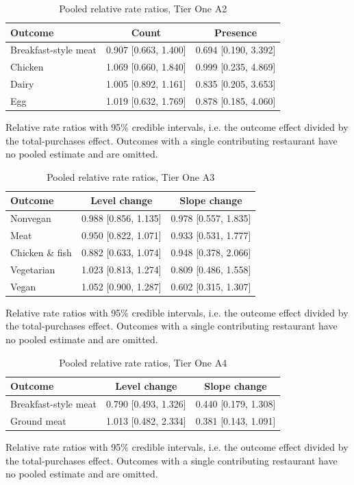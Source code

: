 \begin{table}[H]
\centering
\caption{Pooled relative rate ratios, Tier One A2}
\label{tab:rr_t1_a2}
\begin{tabular}{lcc}
\toprule
Outcome & Count & Presence \\
\midrule
Breakfast-style meat & 0.907 [0.663, 1.400] & 0.694 [0.190, 3.392] \\
Chicken & 1.069 [0.660, 1.840] & 0.999 [0.235, 4.869] \\
Dairy & 1.005 [0.892, 1.161] & 0.835 [0.205, 3.653] \\
Egg & 1.019 [0.632, 1.769] & 0.878 [0.185, 4.060] \\
\bottomrule
\end{tabular}
\par\smallskip\footnotesize Relative rate ratios with 95\% credible intervals, i.e. the outcome effect divided by the total-purchases effect. Outcomes with a single contributing restaurant have no pooled estimate and are omitted.
\end{table}

\begin{table}[H]
\centering
\caption{Pooled relative rate ratios, Tier One A3}
\label{tab:rr_t1_a3}
\begin{tabular}{lcc}
\toprule
Outcome & Level change & Slope change \\
\midrule
Nonvegan & 0.988 [0.856, 1.135] & 0.978 [0.557, 1.835] \\
Meat & 0.950 [0.822, 1.071] & 0.933 [0.531, 1.777] \\
Chicken \& fish & 0.882 [0.633, 1.074] & 0.948 [0.378, 2.066] \\
Vegetarian & 1.023 [0.813, 1.274] & 0.809 [0.486, 1.558] \\
Vegan & 1.052 [0.900, 1.287] & 0.602 [0.315, 1.307] \\
\bottomrule
\end{tabular}
\par\smallskip\footnotesize Relative rate ratios with 95\% credible intervals, i.e. the outcome effect divided by the total-purchases effect. Outcomes with a single contributing restaurant have no pooled estimate and are omitted.
\end{table}

\begin{table}[H]
\centering
\caption{Pooled relative rate ratios, Tier One A4}
\label{tab:rr_t1_a4}
\begin{tabular}{lcc}
\toprule
Outcome & Level change & Slope change \\
\midrule
Breakfast-style meat & 0.790 [0.493, 1.326] & 0.440 [0.179, 1.308] \\
Ground meat & 1.013 [0.482, 2.334] & 0.381 [0.143, 1.091] \\
\bottomrule
\end{tabular}
\par\smallskip\footnotesize Relative rate ratios with 95\% credible intervals, i.e. the outcome effect divided by the total-purchases effect. Outcomes with a single contributing restaurant have no pooled estimate and are omitted.
\end{table}


